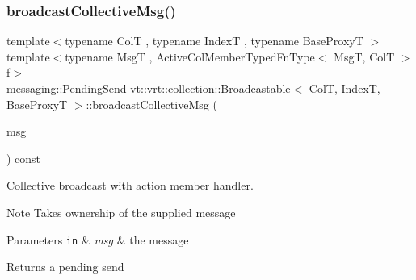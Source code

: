 \subsubsection{\texorpdfstring{broadcast\+Collective\+Msg()}{broadcastCollectiveMsg()}\hspace{0.1cm}{\footnotesize\ttfamily [2/2]}}
{\footnotesize\ttfamily template$<$typename ColT , typename IndexT , typename Base\+ProxyT $>$ \\
template$<$typename MsgT , Active\+Col\+Member\+Typed\+Fn\+Type$<$ Msg\+T, Col\+T $>$ f$>$ \\
\hyperlink{structvt_1_1messaging_1_1_pending_send}{messaging\+::\+Pending\+Send} \hyperlink{structvt_1_1vrt_1_1collection_1_1_broadcastable}{vt\+::vrt\+::collection\+::\+Broadcastable}$<$ ColT, IndexT, Base\+ProxyT $>$\+::broadcast\+Collective\+Msg (\begin{DoxyParamCaption}\item[{\hyperlink{structvt_1_1messaging_1_1_msg_ptr_thief}{messaging\+::\+Msg\+Ptr\+Thief}$<$ MsgT $>$}]{msg }\end{DoxyParamCaption}) const}



Collective broadcast with action member handler. 

\begin{DoxyNote}{Note}
Takes ownership of the supplied message
\end{DoxyNote}

\begin{DoxyParams}[1]{Parameters}
\mbox{\tt in}  & {\em msg} & the message\\
\hline
\end{DoxyParams}
\begin{DoxyReturn}{Returns}
a pending send 
\end{DoxyReturn}
\mbox{\label{structvt_1_1vrt_1_1collection_1_1_broadcastable_a520d37e5da6ce89657f6d33162a23003}} 
